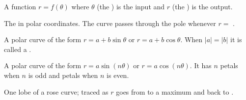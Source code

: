 \documentclass[10pt]{article}
\begin{document}
\begin{vocabbox}
\begin{description}[leftmargin=0pt, itemsep=6pt]
  \item[\termblanklong{polar function}]
    A function $r = f(\theta)$ where $\theta$ (the \underline{\hspace{2cm}})
    is the input and $r$ (the \underline{\hspace{2cm}}) is the output.

  \item[\termblanklong{pole}]
    The \underline{\hspace{2.5cm}} in polar coordinates. The curve passes through
    the pole whenever $r = $ \underline{\hspace{1cm}}.

  \item[\termblanklong{limaçon}]
    A polar curve of the form $r = a + b\sin\theta$ or $r = a + b\cos\theta$.
    When $|a| = |b|$ it is called a \underline{\hspace{2cm}}.

  \item[\termblanklong{rose curve}]
    A polar curve of the form $r = a\sin(n\theta)$ or $r = a\cos(n\theta)$.
    It has $n$ petals when $n$ is odd and \underline{\hspace{1cm}} petals when
    $n$ is even.

  \item[\termblanklong{petal}]
    One lobe of a rose curve; traced as $r$ goes from \underline{\hspace{0.8cm}}
    to a maximum and back to \underline{\hspace{0.8cm}}.
\end{description}
\end{vocabbox}

\vspace{0.08in}
\end{document}
